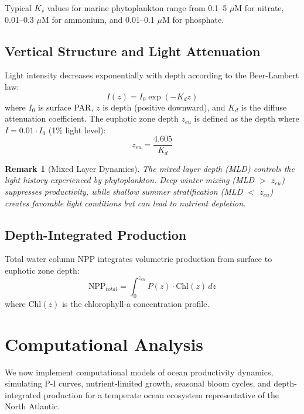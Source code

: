 \documentclass[a4paper, 11pt]{article}
\newtheorem{remark}{Remark}[section]
\begin{document}
Typical $K_s$ values for marine phytoplankton range from 0.1--5 $\mu$M for nitrate,
0.01--0.3 $\mu$M for ammonium, and 0.01--0.1 $\mu$M for phosphate.

\subsection{Vertical Structure and Light Attenuation}

Light intensity decreases exponentially with depth according to the Beer-Lambert law:
\begin{equation}
I(z) = I_0 \exp(-K_d z)
\end{equation}
where $I_0$ is surface PAR, $z$ is depth (positive downward), and $K_d$ is the diffuse
attenuation coefficient. The euphotic zone depth $z_{eu}$ is defined as the depth where
$I = 0.01 \cdot I_0$ (1\% light level):
\begin{equation}
z_{eu} = \frac{4.605}{K_d}
\end{equation}

\begin{remark}[Mixed Layer Dynamics]
The mixed layer depth (MLD) controls the light history experienced by phytoplankton. Deep
winter mixing (MLD $>$ $z_{eu}$) suppresses productivity, while shallow summer stratification
(MLD $<$ $z_{eu}$) creates favorable light conditions but can lead to nutrient depletion.
\end{remark}

\subsection{Depth-Integrated Production}

Total water column NPP integrates volumetric production from surface to euphotic zone depth:
\begin{equation}
\text{NPP}_{total} = \int_0^{z_{eu}} P(z) \cdot \text{Chl}(z) \, dz
\end{equation}
where Chl$(z)$ is the chlorophyll-a concentration profile.

\section{Computational Analysis}

We now implement computational models of ocean productivity dynamics, simulating P-I curves,
nutrient-limited growth, seasonal bloom cycles, and depth-integrated production for a temperate
ocean ecosystem representative of the North Atlantic.
\end{document}
